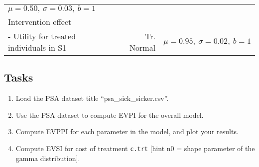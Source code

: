 \documentclass[
]{article}
\begin{document}
\begin{longtable}[]{@{}lrr@{}}
\begin{minipage}[t]{0.42\columnwidth}
\(\mu = 0.50, \ \sigma = 0.03, \ b = 1\)\strut
\end{minipage}\tabularnewline
\begin{minipage}[t]{0.32\columnwidth}\raggedright
Intervention effect\strut
\end{minipage} & \begin{minipage}[t]{0.17\columnwidth}\raggedleft
\strut
\end{minipage} & \begin{minipage}[t]{0.42\columnwidth}\raggedleft
\strut
\end{minipage}\tabularnewline
\begin{minipage}[t]{0.32\columnwidth}\raggedright
- Utility for treated individuals in S1\strut
\end{minipage} & \begin{minipage}[t]{0.17\columnwidth}\raggedleft
Tr. Normal\strut
\end{minipage} & \begin{minipage}[t]{0.42\columnwidth}\raggedleft
\(\mu = 0.95, \ \sigma = 0.02, \ b = 1\)\strut
\end{minipage}\tabularnewline
\bottomrule
\end{longtable}

\hypertarget{tasks}{%
\subsection{Tasks}\label{tasks}}

\begin{enumerate}
\def\labelenumi{\arabic{enumi}.}
\item
  Load the PSA dataset title ``psa\_sick\_sicker.csv''.
\item
  Use the PSA dataset to compute EVPI for the overall model.
\item
  Compute EVPPI for each parameter in the model, and plot your results.
\item
  Compute EVSI for cost of treatment \texttt{c.trt} {[}hint n0 = shape
  parameter of the gamma distribution{]}.
\end{enumerate}
\end{document}
